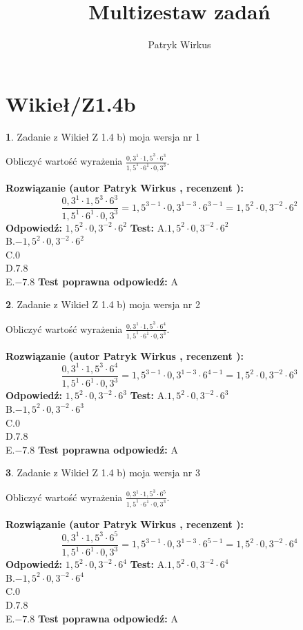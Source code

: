 \documentclass[12pt, a4paper]{article}
\title{Multizestaw zadań}
\author{Patryk Wirkus}
\date{}
\theoremstyle{definition} %
\newtheorem{zad}{}
\newcommand{\kategoria}[1]{\section{#1}}
\newcommand{\zadStart}[1]{\begin{zad}#1\newline}
\newcommand{\zadStop}{\end{zad}}
\newcommand{\rozwStart}[2]{\noindent \textbf{Rozwiązanie (autor #1 , recenzent #2): }\newline}
\newcommand{\rozwStop}{\newline}
\newcommand{\odpStart}{\noindent \textbf{Odpowiedź:}\newline}
\newcommand{\odpStop}{\newline}
\newcommand{\testStart}{\noindent \textbf{Test:}\newline}
\newcommand{\testStop}{\newline}
\newcommand{\kluczStart}{\noindent \textbf{Test poprawna odpowiedź:}\newline}
\newcommand{\kluczStop}{\newline}
\begin{document}
\maketitle

\kategoria{Wikieł/Z1.4b}


\zadStart{Zadanie z Wikieł Z 1.4 b) moja wersja nr 1}

Obliczyć wartość wyrażenia $\frac{0,3^{1}\cdot1,5^{3}\cdot6^{3}}{1,5^{1}\cdot6^{1}\cdot0,3^{3}}$.
\zadStop
\rozwStart{Patryk Wirkus}{}
$$\frac{0,3^{1}\cdot1,5^{3}\cdot6^{3}}{1,5^{1}\cdot6^{1}\cdot0,3^{3}} = 1,5^{3-1} \cdot 0,3^{1-3} \cdot 6^{3-1} = 1,5^{2} \cdot 0,3^{-2} \cdot 6^{2}$$
\rozwStop
\odpStart
$1,5^{2} \cdot 0,3^{-2} \cdot 6^{2}$
\odpStop
\testStart
A.$1,5^{2} \cdot 0,3^{-2} \cdot 6^{2}$\\ B.$-1,5^{2} \cdot 0,3^{-2} \cdot 6^{2}$\\ C.$0$\\ D.$7.8$\\ E.$-7.8$
\testStop
\kluczStart
A
\kluczStop



\zadStart{Zadanie z Wikieł Z 1.4 b) moja wersja nr 2}

Obliczyć wartość wyrażenia $\frac{0,3^{1}\cdot1,5^{3}\cdot6^{4}}{1,5^{1}\cdot6^{1}\cdot0,3^{3}}$.
\zadStop
\rozwStart{Patryk Wirkus}{}
$$\frac{0,3^{1}\cdot1,5^{3}\cdot6^{4}}{1,5^{1}\cdot6^{1}\cdot0,3^{3}} = 1,5^{3-1} \cdot 0,3^{1-3} \cdot 6^{4-1} = 1,5^{2} \cdot 0,3^{-2} \cdot 6^{3}$$
\rozwStop
\odpStart
$1,5^{2} \cdot 0,3^{-2} \cdot 6^{3}$
\odpStop
\testStart
A.$1,5^{2} \cdot 0,3^{-2} \cdot 6^{3}$\\ B.$-1,5^{2} \cdot 0,3^{-2} \cdot 6^{3}$\\ C.$0$\\ D.$7.8$\\ E.$-7.8$
\testStop
\kluczStart
A
\kluczStop



\zadStart{Zadanie z Wikieł Z 1.4 b) moja wersja nr 3}

Obliczyć wartość wyrażenia $\frac{0,3^{1}\cdot1,5^{3}\cdot6^{5}}{1,5^{1}\cdot6^{1}\cdot0,3^{3}}$.
\zadStop
\rozwStart{Patryk Wirkus}{}
$$\frac{0,3^{1}\cdot1,5^{3}\cdot6^{5}}{1,5^{1}\cdot6^{1}\cdot0,3^{3}} = 1,5^{3-1} \cdot 0,3^{1-3} \cdot 6^{5-1} = 1,5^{2} \cdot 0,3^{-2} \cdot 6^{4}$$
\rozwStop
\odpStart
$1,5^{2} \cdot 0,3^{-2} \cdot 6^{4}$
\odpStop
\testStart
A.$1,5^{2} \cdot 0,3^{-2} \cdot 6^{4}$\\ B.$-1,5^{2} \cdot 0,3^{-2} \cdot 6^{4}$\\ C.$0$\\ D.$7.8$\\ E.$-7.8$
\testStop
\kluczStart
A
\kluczStop
\end{document}
